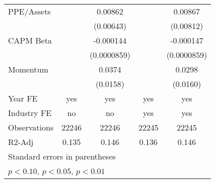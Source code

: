 {\begin{tabular}{l*{4}{c}}
PPE/Assets          &                     &     0.00862         &                     &     0.00867         \\
                    &                     &   (0.00643)         &                     &   (0.00812)         \\
CAPM Beta           &                     &   -0.000144\sym{*}  &                     &   -0.000147\sym{*}  \\
                    &                     & (0.0000859)         &                     & (0.0000859)         \\
Momentum            &                     &      0.0374\sym{**} &                     &      0.0298\sym{*}  \\
                    &                     &    (0.0158)         &                     &    (0.0160)         \\
\hline
Year FE             &         yes         &         yes         &         yes         &         yes         \\
Industry FE         &          no         &          no         &         yes         &         yes         \\
Observations        &       22246         &       22246         &       22245         &       22245         \\
R2-Adj              &       0.135         &       0.146         &       0.136         &       0.146         \\
\hline\hline
\multicolumn{5}{l}{\footnotesize Standard errors in parentheses}\\
\multicolumn{5}{l}{\footnotesize \sym{*} \(p<0.10\), \sym{**} \(p<0.05\), \sym{***} \(p<0.01\)}\\
\end{tabular}
}
